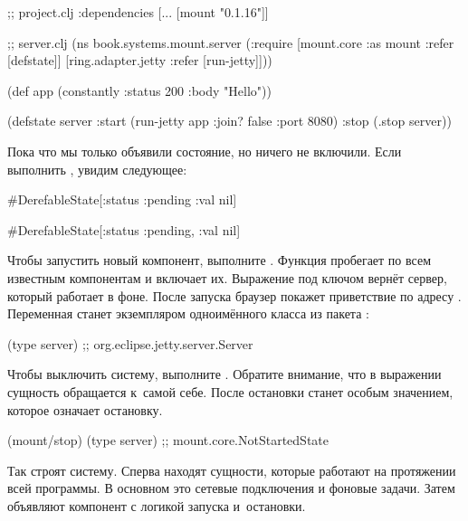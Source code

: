 \else

\begin{clojure}
;; project.clj
:dependencies [... [mount "0.1.16"]]

;; server.clj
(ns book.systems.mount.server
  (:require
   [mount.core :as mount :refer [defstate]]
   [ring.adapter.jetty :refer [run-jetty]]))

(def app (constantly {:status 200 :body "Hello"}))

(defstate server
  :start (run-jetty app {:join? false :port 8080})
  :stop (.stop server))
\end{clojure}

\fi

Пока что мы только объявили состояние, но ничего не включили. Если выполнить
, увидим следующее:

\ifnarrow

\begin{clojure}
#DerefableState[{:status :pending
                 :val nil}]
\end{clojure}

\else

\begin{clojure}
#DerefableState[{:status :pending, :val nil}]
\end{clojure}

\fi

Чтобы запустить новый компонент, выполните . Функция
пробегает по всем известным компонентам и включает их. Выражение
 под ключом  вернёт сервер, который работает
в фоне. После запуска браузер покажет приветствие по адресу
. Переменная  станет экземпляром
одноимённого класса из пакета :

\begin{clojure}
(type server)
;; org.eclipse.jetty.server.Server
\end{clojure}

Чтобы выключить систему, выполните . Обратите внимание, что в
выражении  сущность обращается к~самой себе. После
остановки  станет особым значением, которое означает остановку.

\begin{clojure}
(mount/stop)
(type server)
;; mount.core.NotStartedState
\end{clojure}

Так строят систему. Сперва находят сущности, которые работают на протяжении всей
программы. В основном это сетевые подключения и фоновые задачи. Затем объявляют
компонент с логикой запуска и~остановки.

